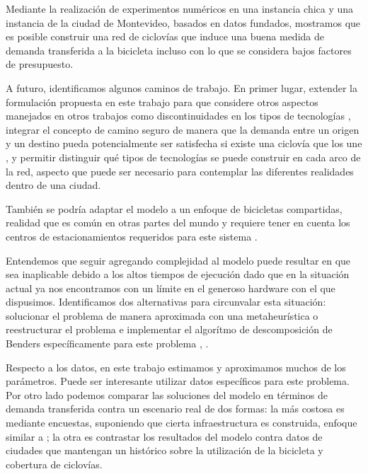 Mediante la realización de experimentos numéricos en una instancia chica y una instancia de la ciudad de Montevideo, basados en datos fundados, mostramos que es posible construir una red de ciclovías que induce una buena medida de demanda transferida a la bicicleta incluso con lo que se considera bajos factores de presupuesto.

A futuro, identificamos algunos caminos de trabajo. En primer lugar, extender la formulación propuesta en este trabajo para que considere otros aspectos manejados en otros trabajos como discontinuidades en los tipos de tecnologías \parencite{baya2021}, integrar el concepto de camino seguro de manera que la demanda entre un origen y un destino pueda potencialmente ser satisfecha si existe una ciclovía que los une \parencite{Duthie2014}, y permitir distinguir qué tipos de tecnologías se puede construir en cada arco de la red, aspecto que puede ser necesario para contemplar las diferentes realidades dentro de una ciudad.

También se podría adaptar el modelo a un enfoque de bicicletas compartidas, realidad que es común en otras partes del mundo y requiere tener en cuenta los centros de estacionamientos requeridos para este sistema \parencite{vogel2016}.

Entendemos que seguir agregando complejidad al modelo puede resultar en que sea inaplicable debido a los altos tiempos de ejecución dado que en la situación actual ya nos encontramos con un límite en el generoso hardware con el que dispusimos. Identificamos dos alternativas para circunvalar esta situación: solucionar el problema de manera aproximada con una metaheurística o reestructurar el problema e implementar el algorítmo de descomposición de Benders específicamente para este problema \parencite{bucarey2022}, \parencite{crainic2021}.

Respecto a los datos, en este trabajo estimamos y aproximamos muchos de los parámetros. Puede ser interesante utilizar datos específicos para este problema. Por otro lado podemos comparar las soluciones del modelo en términos de demanda transferida contra un escenario real de dos formas: la más costosa es mediante encuestas, suponiendo que cierta infraestructura es construida, enfoque similar a \textcite{shwe2014}; la otra es contrastar los resultados del modelo contra datos de ciudades que mantengan un histórico sobre la utilización de la bicicleta y cobertura de ciclovías.

